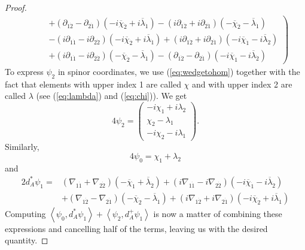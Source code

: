 \documentclass[twoside]{amsart}
\renewcommand{\eqref}[1]{(\ref{eq:#1})}
\newcommand{\enm}[1]{\ensuremath{#1}}
\newcommand{\ip}[2]{\enm{\left<#1,#2\right>}}
\renewcommand{\bar}[1]{\overline{#1}}
\newcommand{\dieven}[2]{\enm{\partial_{#1\dot{#2}}}}
\newcommand{\dievencov}[2]{\enm{\nabla_{#1\dot{#2}}}}
\newcommand{\cbi}[1]{\enm{\bar{\chi}_{\dot{#1}}}}
\newcommand{\lbi}[1]{\enm{\bar{\lambda}_{\dot{#1}}}}
\begin{document}
\begin{proof}
\[\begin{split}
& \qquad\left.\begin{array}{c}
    +(\dieven{1}{2}-\dieven{2}{1})(-i\cbi{2}+i\lbi{1})
    -(i\dieven{1}{2}+i\dieven{2}{1})(-\cbi{2}-\lbi{1}) \\
%
    -(i\dieven{1}{1}-i\dieven{2}{2})(-i\cbi{2}+i\lbi{1})
    +(i\dieven{1}{2}+i\dieven{2}{1})(-i\cbi{1}-i\lbi{2}) \\
%
    +(i\dieven{1}{1}-i\dieven{2}{2})(-\cbi{2}-\lbi{1})
    -(\dieven{1}{2}-\dieven{2}{1})(-i\cbi{1}-i\lbi{2})
\end{array}\right)
\end{split}\]
To express \( \psi_{2} \) in spinor coordinates, we use
\eqref{wedgetohom} together with the fact that elements with upper
index 1 are called \( \chi \) and with upper index 2 are called \( \lambda
\) (see \eqref{lambda} and \eqref{chi}).  We get
\[ 4\psi_{2} = \left(
\begin{array}{c}
    -i\chi_{1}+i\lambda_{2} \\
    \chi_{2}-\lambda_{1} \\
    -i\chi_{2}-i\lambda_{1}
\end{array}\right).\]
Similarly,
\[ 4\psi_{0} = \chi_{1}+\lambda_{2} \]
and
\[ \begin{split}
2d_{A}^{*}\psi_{1} = & (\dievencov{1}{1}+\dievencov{2}{2})
                      (-\cbi{1} + \lbi{2})+
                      (i\dievencov{1}{1}-i\dievencov{2}{2})
                      (-i\cbi{1} - i\lbi{2}) \\
                    & + (\dievencov{1}{2}-\dievencov{2}{1})
                      (-\cbi{2} - \lbi{1}) +
                      (i\dievencov{1}{2}+i\dievencov{2}{1})
                      (-i\cbi{2} + i\lbi{1})
\end{split}
\]
Computing \( \ip{\psi_{0}}{d_{A}^{*}\psi_{1}} +
\ip{\psi_{2}}{d_{A}^{+}\psi_{1}} \) is now a matter of combining
these expressions and cancelling half of the terms, leaving us with
the desired quantity.
\end{proof}
\end{document}
